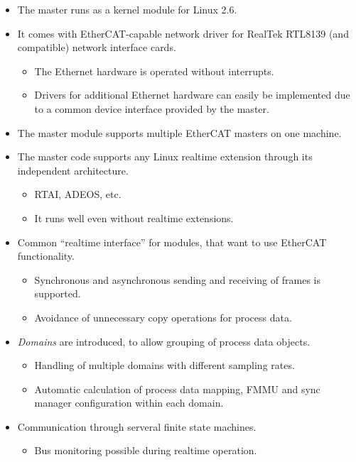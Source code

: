 \documentclass[a4paper,12pt,BCOR6mm,bibtotoc,idxtotoc]{scrbook}
\begin{document}
\begin{itemize}
\item The master runs as a kernel module for Linux 2.6.
\item It comes with EtherCAT-capable network driver for RealTek
  RTL8139 (and compatible) network interface cards.
  \begin{itemize}
  \item The Ethernet hardware is operated without interrupts.
  \item Drivers for additional Ethernet hardware can easily be
    implemented due to a common device interface provided by the
    master.
  \end{itemize}
\item The master module supports multiple EtherCAT masters on one
  machine.
\item The master code supports any Linux realtime extension through
  its independent architecture.
  \begin{itemize}
  \item RTAI,
    ADEOS, etc.
  \item It runs well even without realtime extensions.
  \end{itemize}
\item Common ``realtime interface'' for modules, that want to use
  EtherCAT functionality.
  \begin{itemize}
  \item Synchronous and asynchronous sending and receiving of frames
    is supported.
  \item Avoidance of unnecessary copy operations for process data.
  \end{itemize}
\item \textit{Domains} are introduced, to allow grouping of process
  data objects.
  \begin{itemize}
  \item Handling of multiple domains with different sampling rates.
  \item Automatic calculation of process data mapping, FMMU and sync manager
    configuration within each domain.
  \end{itemize}
\item Communication through serveral finite state machines.
  \begin{itemize}
  \item Bus monitoring possible during realtime operation.

\end{itemize}
\end{itemize}
\end{document}
